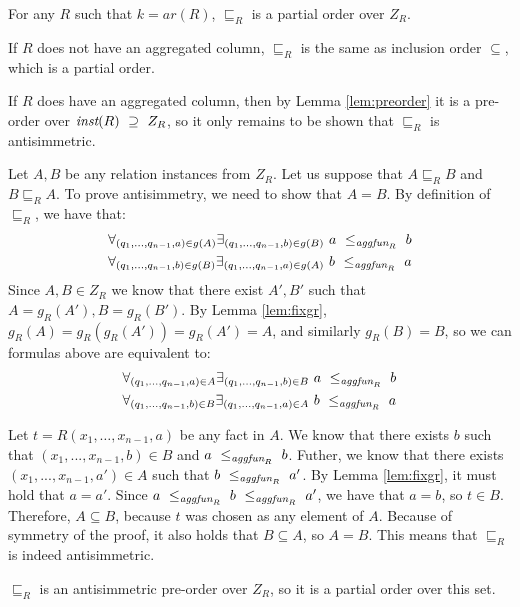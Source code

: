 \begin{lem}
For any $R$ such that $k=ar(R)$, $\sqsubseteq_R$ is a partial order over $Z_R$.
\end{lem}
\begin{prof}
If $R$ does not have an aggregated column, $\sqsubseteq_R$ is the same as inclusion order $\subseteq$, which is a partial order.

If $R$ does have an aggregated column, then by Lemma \ref{lem:preorder} it is a pre-order over $\textit{inst}(R)~\supseteq~Z_R$, so it only remains to be shown that $\sqsubseteq_R$ is antisimmetric.

Let $A, B$ be any relation instances from $Z_R$. Let us suppose that $A \sqsubseteq_R B$ and $B \sqsubseteq_R A$. To prove antisimmetry, we need to show that $A = B$. By definition of $\sqsubseteq_R$, we have that:
\begin{align*}
\forall_{(q_1, ..., q_{n-1}, a) \in g(A)} \exists_{(q_1, ..., q_{n-1}, b) \in g(B)}~a~\le_{\textit{aggfun}_R}~b \\
\forall_{(q_1, ..., q_{n-1}, b) \in g(B)} \exists_{(q_1, ..., q_{n-1}, a) \in g(A)}~b~\le_{\textit{aggfun}_R}~a
\end{align*}
Since $A, B \in Z_R$ we know that there exist $A', B'$ such that $A = g_R(A'), B = g_R(B')$. By Lemma \ref{lem:fixgr}, $g_R(A) = g_R(g_R(A')) = g_R(A') = A$, and similarly $g_R(B) = B$, so we can formulas above are equivalent to:
\begin{align*}
\forall_{(q_1, ..., q_{n-1}, a) \in A} \exists_{(q_1, ..., q_{n-1}, b) \in B}~a~\le_{\textit{aggfun}_R}~b \\
\forall_{(q_1, ..., q_{n-1}, b) \in B} \exists_{(q_1, ..., q_{n-1}, a) \in A}~b~\le_{\textit{aggfun}_R}~a
\end{align*}

Let $t = R(x_1, \dots, x_{n-1}, a)$ be any fact in $A$. We know that there exists $b$ such that $(x_1, ..., x_{n-1}, b) \in B$ and $a~\le_{\textit{aggfun}_R}~b$. Futher, we know that there exists $(x_1, ..., x_{n-1}, a') \in A$ such that $b~\le_{\textit{aggfun}_R}~a'$. By Lemma \ref{lem:fixgr}, it must hold that $a = a'$. Since $a~\le_{\textit{aggfun}_R}~b~\le_{\textit{aggfun}_R}~a'$, we have that $a = b$, so $t \in B$. Therefore, $A \subseteq B$, because $t$ was chosen as any element of $A$. Because of symmetry of the proof, it also holds that $B \subseteq A$, so $A = B$. This means that $\sqsubseteq_R$ is indeed antisimmetric.

$\sqsubseteq_R$ is an antisimmetric pre-order over $Z_R$, so it is a partial order over this set.
\end{prof}

